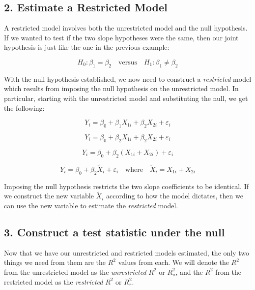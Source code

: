 \documentclass[
]{book}
\begin{document}
\hypertarget{estimate-a-restricted-model}{%
\subsection*{2. Estimate a Restricted Model}\label{estimate-a-restricted-model}}

A restricted model involves both the unrestricted model and the null hypothesis. If we wanted to test if the two slope hypotheses were the same, then our joint hypothesis is just like the one in the previous example:

\[H_0:\beta_1=\beta_2 \quad \text{versus} \quad H_1:\beta_1 \neq \beta_2\]

With the null hypothesis established, we now need to construct a \emph{restricted} model which results from imposing the null hypothesis on the unrestricted model. In particular, starting with the unrestricted model and substituting the null, we get the following:

\[Y_i = \beta_0 + \beta_1 X_{1i} + \beta_2 X_{2i} + \varepsilon_i\]

\[Y_i = \beta_0 + \beta_2 X_{1i} + \beta_2 X_{2i} + \varepsilon_i\]

\[Y_i = \beta_0 + \beta_2 (X_{1i} + X_{2i}) + \varepsilon_i\]

\[Y_i = \beta_0 + \beta_2 \tilde{X}_{i} + \varepsilon_i \quad \text{where} \quad \tilde{X}_{i} = X_{1i} + X_{2i}\]

Imposing the null hypothesis restricts the two slope coefficients to be identical. If we construct the new variable \(\tilde{X}_i\) according to how the model dictates, then we can use the new variable to estimate the \emph{restricted} model.

\hypertarget{construct-a-test-statistic-under-the-null}{%
\subsection*{3. Construct a test statistic under the null}\label{construct-a-test-statistic-under-the-null}}

Now that we have our unrestricted and restricted models estimated, the only two things we need from them are the \(R^2\) values from each. We will denote the \(R^2\) from the unrestricted model as the \emph{unrestricted} \(R^2\) or \(R^2_u\), and the \(R^2\) from the restricted model as the \emph{restricted} \(R^2\) or \(R^2_r\).
\end{document}
